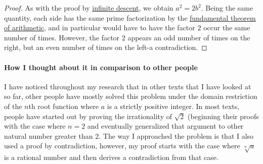 \documentclass{turabian-researchpaper}
\begin{document}
\begin{proof}
    As with the proof by \href{https://en.wikipedia.org/wiki/Proof_by_infinite_descent}{infinite descent}, we obtain \(a^2 = 2b^2\). Being the same quantity, each side has the same prime factorization by the \href{https://en.wikipedia.org/wiki/Fundamental_theorem_of_arithmetic}{fundamental theorem of arithmetic}, and in particular would have to have the factor \(2\) occur the same number of times. However, the factor \(2\) appears an odd number of times on the right, but an even number of times on the left-a contradiction. 
\end{proof}
 
\paragraph{How I thought about it in comparison to other people}
I have noticed throughout my research that in other texts that I have looked at so far, other people have mostly solved this problem under the domain restriction of the \(n\)th root function where \(a\) is a strictly positive integer. In most texts, people have started out by proving the irrationality of \(\sqrt{2}\) (beginning their proofs with the case where \(n = 2\) and eventually generalized that argument to other natural number greater than \(2\). The way I approached the problem is that I also used a proof by contradiction, however, my proof starts with the case where \(\sqrt[n]{a}\) is a rational number and then derives a contradiction from that case. 




\end{document}

